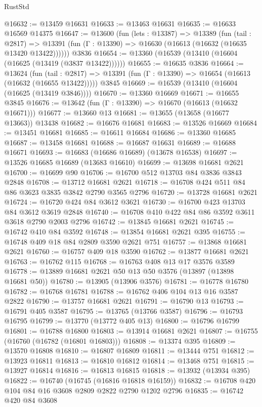 \begin{lexlean}{RustStd}
\begin{coremodule}
@16632 := @13459 @16631
@16633 := @13463 @16631
@16635 := @16633 @16569 @14375
@16647 := @13600
    (fun (lets : @13387) =>
    @13389
      (fun (tail : @2817) =>
      @13391 (fun (Γ : @13390) => @16630 (@16613 (@16632 (@16635 @13420 @13422))))))
    @3836
@16654 := @13360 (@16539 (@13410 (@16604 (@16625 (@13419 (@3837 @13422))))))
@16655 := @16635 @3836
@16664 := @13624
    (fun (tail : @2817) => @13391 (fun (Γ : @13390) => @16654 (@16613 (@16632 (@16655 @13422)))))
    @3845
@16669 := @16539 (@13410 (@16604 (@16625 (@13419 @3846))))
@16670 := @13360 @16669
@16671 := @16655 @3845
@16676 := @13642 (fun (Γ : @13390) => @16670 (@16613 (@16632 @16671)))
@16677 := @13660 @13
@16681 := @13655 (@13658 (@16677 @13663)) @13438
@16682 := @16676 @16681
@16683 := @13526 @16669
@16684 := @13451 @16681
@16685 := @16611 @16684
@16686 := @13360 @16685
@16687 := @13458 @16681
@16688 := @16687 @16631
@16689 := @16688 @16671
@16693 := @16683 (@16686 @16689) (@13678 @16538)
@16697 := @13526 @16685 @16689 (@13683 @16610)
@16699 := @13698 @16681 @2621
@16700 := @16699 @90
@16706 := @16700 @512 @13703 @84 @3836 @3843 @2848
@16708 := @13712 @16681 @2621
@16718 := @16708 @424 @511 @84 @86 @3623 @3835 @3842 @2790 @3565 @2796
@16720 := @13728 @16681 @2621
@16724 := @16720 @424 @84 @3612 @3621
@16730 := @16700 @423 @13703 @84 @3612 @3619 @2848
@16740 := @16708 @410 @422 @84 @86 @3592 @3611 @3618 @2790 @2003 @2796
@16742 := @13845 @16681 @2621
@16745 := @16742 @410 @84 @3592
@16748 := @13854 @16681 @2621 @395
@16755 := @16748 @409 @18 @84 @2809 @3590 @2621 @751
@16757 := @13868 @16681 @2621
@16760 := @16757 @409 @18 @3590
@16762 := @13877 @16681 @2621
@16763 := @16762 @115
@16768 := @16763 @408 @13 @17 @3576 @3589
@16778 := @13889 @16681 @2621 @50 @13 @50 @3576 (@13897 (@13898 @16681 @50))
@16780 := @13905 (@13906 @3576)
@16781 := @16778 @16780
@16782 := @16768 @16781
@16788 := @16762 @406 @104 @13 @16 @3587 @2822
@16790 := @13757 @16681 @2621
@16791 := @16790 @13
@16793 := @16791 @405 @3587
@16795 := @13765 (@13766 @3587)
@16796 := @16793 @16795
@16799 := @13770 (@13772 @405 @13)
@16800 := @16796 @16799
@16801 := @16788 @16800
@16803 := @13914 @16681 @2621
@16807 := @16755 (@16760 (@16782 (@16801 @16803)))
@16808 := @13374 @395
@16809 := @13570 @16808
@16810 := @16807 @16809
@16811 := @13444 @751
@16812 := @13923 @16811
@16813 := @16810 @16812
@16814 := @13468 @751
@16815 := @13927 @16814
@16816 := @16813 @16815
@16818 := @13932 (@13934 @395)
@16822 := @16740 (@16745 (@16816 @16818 @16159))
@16832 := @16708 @420 @104 @84 @16 @3608 @2809 @2822 @2790 @1202 @2796
@16835 := @16742 @420 @84 @3608

\end{coremodule}
\end{lexlean}
